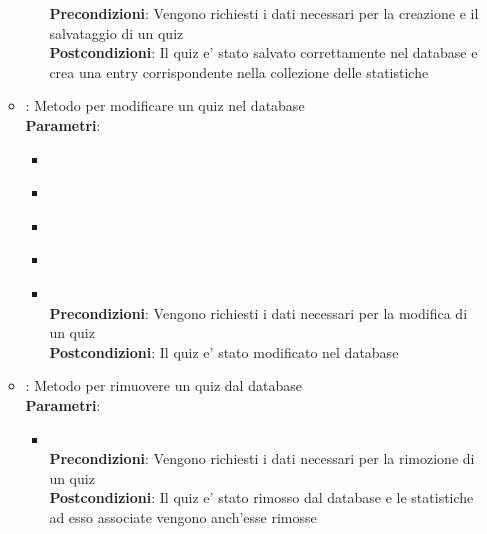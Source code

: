 \begin{itemize}
\begin{itemize}
\begin{itemize}
		\textbf{Precondizioni}: Vengono richiesti i dati necessari per la creazione e il salvataggio di un quiz\\
		\textbf{Postcondizioni}: Il quiz e' stato salvato correttamente nel database e crea una entry corrispondente nella collezione delle statistiche\\
	\end{itemize}
	\item{} :  Metodo per modificare un quiz nel database\\
	\textbf{Parametri}:
	\begin{itemize}
		\item{}\\
		\item{}\\
		\item{}\\
		\item{}\\
		\item{}\\
		\textbf{Precondizioni}: Vengono richiesti i dati necessari per la modifica di un quiz\\
		\textbf{Postcondizioni}: Il quiz e' stato modificato nel database\\
	\end{itemize}
	\item{} : Metodo per rimuovere un quiz dal database\\
	\textbf{Parametri}:
	\begin{itemize}
		\item{}\\
		\textbf{Precondizioni}: Vengono richiesti i dati necessari per la rimozione di un quiz\\
		\textbf{Postcondizioni}: Il quiz e' stato rimosso dal database e le statistiche ad esso associate vengono anch'esse rimosse\\
	\end{itemize}
\end{itemize}
\end{itemize}
\newpage

